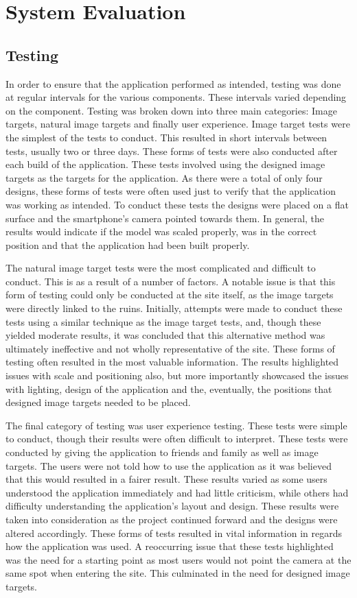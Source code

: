 \chapter{System Evaluation}
\section{Testing}
In order to ensure that the application performed as intended, testing was done at regular intervals for the various components. These intervals varied depending on the component.
Testing was broken down into three main categories: Image targets, natural image targets and finally user experience.
Image target tests were the simplest of the tests to conduct. This resulted in short intervals between tests, usually two or three days. These forms of tests were also conducted after each build of the application. These tests involved using the designed image targets as the targets for the application. As there were a total of only four designs, these forms of tests were often used just to verify that the application was working as intended. To conduct these tests the designs were placed on a flat surface and the smartphone's camera pointed towards them. In general, the results would indicate if the model was scaled properly, was in the correct position and that the application had been built properly.

The natural image target tests were the most complicated and difficult to conduct. This is as a result of a number of factors. A notable issue is that this form of testing could only be conducted at the site itself, as the image targets were directly linked to the ruins. Initially, attempts were made to conduct these tests using a similar technique as the image target tests, and, though these yielded moderate results, it was concluded that this alternative method was ultimately ineffective and not wholly representative of the site. These forms of testing often resulted in the most valuable information. The results highlighted issues with scale and positioning also, but more importantly showcased the issues with lighting, design of the application and the, eventually, the positions that designed image targets needed to be placed.

The final category of testing was user experience testing. These tests were simple to conduct, though their results were often difficult to interpret. These tests were conducted by giving the application to friends and family as well as image targets. The users were not told how to use the application as it was believed that this would resulted in a fairer result. These results varied as some users understood the application immediately and had little criticism, while others had difficulty understanding the application's layout and design. These results were taken into consideration as the project continued forward and the designs were altered accordingly. These forms of tests resulted in vital information in regards how the application was used. A reoccurring issue that these tests highlighted was the need for a starting point as most users would not point the camera at the same spot when entering the site. This culminated in the need for designed image targets. 

